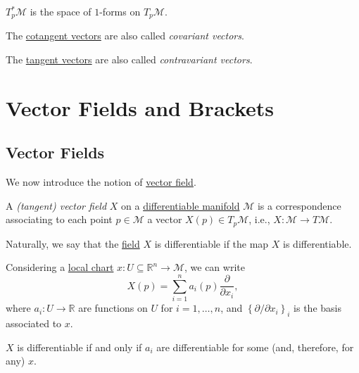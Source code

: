 \begin{remark}
	\(T^{\ast} _p \mathcal{M} \) is the space of \(1\)-forms on \(T_p \mathcal{M} \).
\end{remark}

\begin{notation}\label{not:covariant-vector}
	The \hyperref[def:cotangent-vector]{cotangent vectors} are also called \emph{covariant vectors}.
\end{notation}

\begin{notation}\label{not:contravariant-vector}
	The \hyperref[def:tangent-vector]{tangent vectors} are also called \emph{contravariant vectors}.
\end{notation}

\section{Vector Fields and Brackets}
\subsection{Vector Fields}
We now introduce the notion of \hyperref[def:vector-field]{vector field}.

\begin{definition}\label{def:vector-field}
	A \emph{(tangent) vector field} \(X\) on a \hyperref[def:smooth-manifold]{differentiable manifold} \(\mathcal{M} \) is a correspondence associating to each point \(p\in \mathcal{M} \) a vector \(X(p)\in T_p \mathcal{M} \), i.e., \(X\colon \mathcal{M} \to T\mathcal{M} \).
\end{definition}

\begin{remark}
	Naturally, we say that the \hyperref[def:vector-field]{field} \(X\) is differentiable if the map \(X\) is differentiable.
\end{remark}

Considering a \hyperref[def:coordinate-chart]{local chart} \(x\colon U \subseteq \mathbb{R} ^n \to \mathcal{M} \), we can write
\[
	X(p) = \sum_{i=1}^{n} a_i(p) \frac{\partial }{\partial x_i},
\]
where \(a_i\colon U \to \mathbb{R} \) are functions on \(U\) for \(i = 1, \ldots , n\), and \(\left\{ \partial / \partial x_i \right\}_{i} \) is the basis associated to \(x\).

\begin{remark}
	\(X\) is differentiable if and only if \(a_i\) are differentiable for some (and, therefore, for any) \(x\).
\end{remark}


